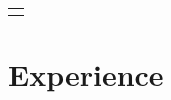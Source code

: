 \documentclass[a4paper,10pt]{extarticle} %
\begin{document}
\begin{tabular}{r|p{18cm}}
\multicolumn{2}{c}{} \\

\end{tabular}




\section{Experience}
\end{document}
